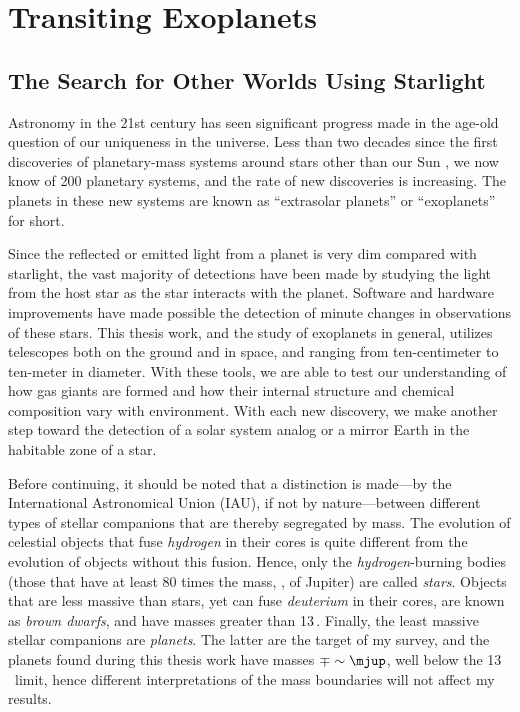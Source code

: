 \chapter[Transiting Exoplanets]%
{%
Transiting Exoplanets}
\label{cha:intro}

\section{The Search for Other Worlds Using Starlight}
\label{cha:intro:sec:search}

Astronomy in the 21st century has seen significant progress made in the age-old question of our uniqueness in the universe. 
Less than two decades since the first discoveries of planetary-mass systems around stars other than our Sun \citep{Latham_Stefanik_Mazeh:nat:1989a, Wolszczan_Frail:nat:1992a, Mayor_Queloz:nat:1995a}, we now know of 200 planetary systems, and the rate of new discoveries is increasing. 
The planets in these new systems are known as ``extrasolar planets'' or ``exoplanets'' for short. 

Since the reflected or emitted light from a planet is very dim compared with starlight, the vast majority of detections have been made by studying the light from the host star as the star interacts with the planet.
Software and hardware improvements have made possible the detection of minute changes in observations of these stars.
This thesis work, and the study of exoplanets in general, utilizes telescopes both on the ground and in space, and ranging from ten-centimeter to ten-meter in diameter. 
With these tools, we are able to test our understanding of how gas giants are formed and how their internal structure and chemical composition vary with environment. 
With each new discovery, we make another step toward the detection of a solar system analog or a mirror Earth in the habitable zone of a star.

Before continuing, it should be noted that a distinction is made---by the International Astronomical Union (IAU), if not by nature---between different types of stellar companions that are thereby segregated by mass.
The evolution of celestial objects that fuse \textit{hydrogen} in their cores is quite different from the evolution of objects without this fusion.
Hence, only the \textit{hydrogen}-burning bodies (those that have at least 80 times the mass, \mjup, of Jupiter) are called \textit{stars}.
Objects that are less massive than stars, yet can fuse \textit{deuterium} in their cores, are known as {\it brown dwarfs}, and have masses greater than 13\,\mjup.
Finally, the least massive stellar companions are {\it planets}.
The latter are the target of my survey, and the planets found during this thesis work have masses $\mp\sim\mjup$, well below the 13\,\mjup\ limit, hence different interpretations of the mass boundaries will not affect my results. 

